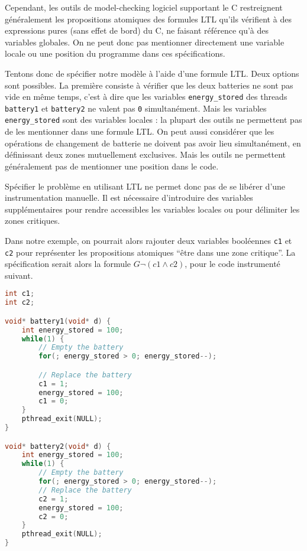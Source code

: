 Cependant, les outils de model-checking logiciel supportant le C restreignent
généralement les propositions atomiques des formules LTL qu'ils vérifient à des
expressions pures (sans effet de bord) du C, ne faisant référence qu'à des
variables globales. On ne peut donc pas mentionner directement une variable
locale ou une position du programme dans ces spécifications.

Tentons donc de spécifier notre modèle à l'aide d'une formule LTL. Deux
options sont possibles. La première consiste à vérifier que les deux
batteries ne sont pas vide en même temps, c'est à dire que les variables
\lstinline!energy_stored! des threads \lstinline!battery1! et
\lstinline!battery2! ne valent pas \lstinline!0! simultanément. Mais les
variables \lstinline!energy_stored! sont des variables locales : la
plupart des outils ne permettent pas de les mentionner dans une formule
LTL. On peut aussi considérer que les opérations de changement de
batterie ne doivent pas avoir lieu simultanément, en définissant deux
zones mutuellement exclusives. Mais les outils ne permettent
généralement pas de mentionner une position dans le code.

Spécifier le problème en utilisant LTL ne permet donc pas de se libérer
d'une instrumentation manuelle. Il est nécessaire d'introduire des
variables supplémentaires pour rendre accessibles les variables locales
ou pour délimiter les zones critiques.

Dans notre exemple, on pourrait alors rajouter deux variables booléennes
\lstinline!c1! et \lstinline!c2! pour représenter les propositions atomiques
``être dans une zone critique''. La spécification serait alors
la formule \(G \lnot (c1 \land c2)\), pour le code instrumenté suivant.

\begin{lstlisting}[language=C]
int c1;
int c2;

void* battery1(void* d) {
    int energy_stored = 100;
    while(1) {
        // Empty the battery
        for(; energy_stored > 0; energy_stored--);

        // Replace the battery
        c1 = 1;
        energy_stored = 100;
        c1 = 0;
    }
    pthread_exit(NULL);
}

void* battery2(void* d) {
    int energy_stored = 100;
    while(1) {
        // Empty the battery
        for(; energy_stored > 0; energy_stored--);
        // Replace the battery
        c2 = 1;
        energy_stored = 100;
        c2 = 0;
    }
    pthread_exit(NULL);
}
\end{lstlisting}

